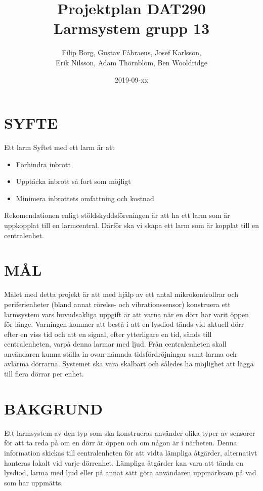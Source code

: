 \documentclass[a4paper]{article}
\title{Projektplan DAT290 \\ \Large Larmsystem grupp 13}
\author{Filip Borg, Gustav Fåhraeus, Josef Karlsson,\\
            Erik Nilsson, Adam Thörnblom, Ben Wooldridge}
\date{2019-09-xx}
\begin{document}
\maketitle
{}
\newpage

\tableofcontents
\newpage



\section{SYFTE}
\label{sec:syfte}
Ett larm 
Syftet med ett larm är att
\begin{itemize}
    \item Förhindra inbrott
    \item Upptäcka inbrott så fort som möjligt
    \item Minimera inbrottets omfattning och kostnad

\end{itemize}
Rekomendationen enligt stöldskyddsföreningen är att ha ett larm
som är uppkopplat till en larmcentral. Därför ska vi skapa ett larm som är kopplat till en centralenhet.

\section{MÅL}
\label{sec:mål}

Målet med detta projekt är att med hjälp av ett antal mikrokontrollrar och periferienheter (bland annat rörelse- och vibrationssensor) konstruera ett larmsystem vars huvudsakliga uppgift är att varna när en dörr har varit öppen för länge. Varningen kommer att bestå i att en lysdiod tänds vid aktuell dörr efter en viss tid och att en signal, efter ytterligare en tid, sänds till centralenheten, varpå denna larmar med ljud. Från centralenheten skall användaren kunna ställa in ovan nämnda tidsfördröjningar samt larma och avlarma dörrarna. Systemet ska vara skalbart och således ha möjlighet att lägga till flera dörrar per enhet.

\section{BAKGRUND}
\label{sec:bakgrund}

Ett larmsystem av den typ som ska konstrueras använder olika typer av sensorer för att ta reda på om en dörr är öppen och om någon är i närheten. Denna information skickas till centralenheten för att vidta lämpliga åtgärder, alternativt hanteras lokalt vid varje dörrenhet.
Lämpliga åtgärder kan vara att tända en lysdiod, larma med ljud eller på annat sätt göra användaren uppmärksam på vad som har uppmätts.
\end{document}
